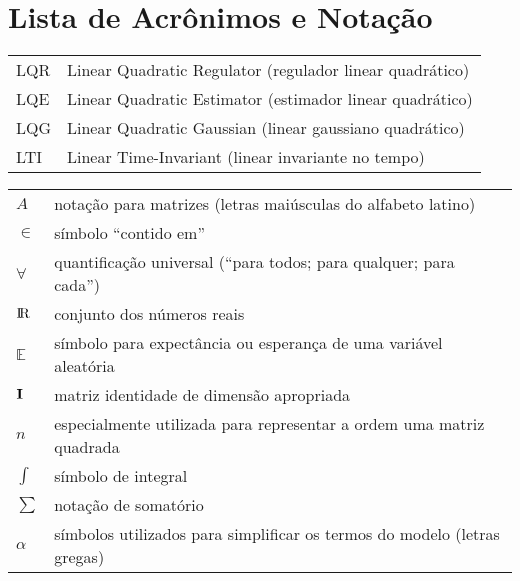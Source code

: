\newpage

\chapter*{Lista de Acrônimos e Notação}

\begin{tabular}{ll}
LQR  & Linear Quadratic Regulator (regulador linear quadrático)\\
LQE  & Linear Quadratic Estimator (estimador linear quadrático)\\
LQG  & Linear Quadratic Gaussian (linear gaussiano quadrático)\\
LTI  & Linear Time-Invariant (linear invariante no tempo)
\end{tabular}

\vspace*{1cm}

\begin{tabular}{ll}
$A$ & notação para matrizes (letras maiúsculas do alfabeto latino)\\
$\in$ & símbolo ``contido em''\\
$\forall$ & quantificação universal (``para todos; para qualquer; para cada'')\\
${\rm I\kern-.17em R}$ & conjunto dos números reais\\
$\mathbb{E}$ & símbolo para expectância ou esperança de uma variável aleatória\\
${\bf I}$ & matriz identidade de dimensão apropriada\\
$n$ & especialmente utilizada para representar a ordem uma matriz quadrada\\
$\int$ & símbolo de integral\\
$\sum$ & notação de somatório\\
$\alpha$ & símbolos utilizados para simplificar os termos do modelo (letras gregas)
\end{tabular}


